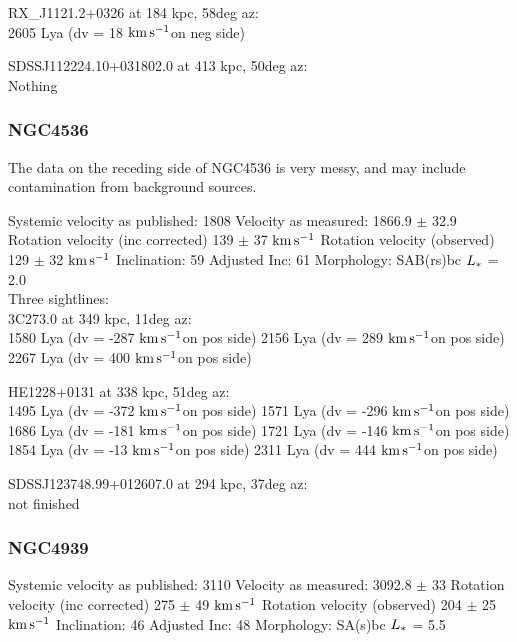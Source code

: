 \documentclass[iop]{emulateapj-rtx4}
\newcommand{\kms}{$\rm km\, s^{-1}$}
\begin{document}
RX\_J1121.2+0326 at 184 kpc, 58deg az: \\
2605 Lya (dv = 18 \kms on neg side)


SDSSJ112224.10+031802.0 at 413 kpc, 50deg az: \\
Nothing


\subsubsection{NGC4536}
The data on the receding side of NGC4536 is very messy, and may include contamination from background sources. 



Systemic velocity as published: 1808
Velocity as measured: 1866.9 $\pm$ 32.9
Rotation velocity (inc corrected) 139 $\pm$ 37 \kms
Rotation velocity (observed) 129 $\pm$ 32 \kms
Inclination: 59
Adjusted Inc: 61
Morphology: SAB(rs)bc
$L_{\**}$ = 2.0 \\

Three sightlines: \\
3C273.0 at 349 kpc, 11deg az: \\
1580 Lya (dv = -287 \kms on pos side)
2156 Lya (dv = 289 \kms on pos side)
2267 Lya (dv = 400 \kms on pos side)


HE1228+0131 at 338 kpc, 51deg az: \\
1495 Lya (dv = -372 \kms on pos side)
1571 Lya (dv = -296 \kms on pos side)
1686 Lya (dv = -181 \kms on pos side)
1721 Lya (dv = -146 \kms on pos side)
1854 Lya (dv = -13 \kms on pos side)
2311 Lya (dv = 444 \kms on pos side)

SDSSJ123748.99+012607.0 at  294 kpc, 37deg az: \\
not finished


\subsubsection{NGC4939}
Systemic velocity as published: 3110
Velocity as measured: 3092.8 $\pm$ 33
Rotation velocity (inc corrected) 275 $\pm$ 49 \kms
Rotation velocity (observed) 204 $\pm$ 25 \kms
Inclination: 46
Adjusted Inc: 48
Morphology: SA(s)bc
$L_{\**}$ = 5.5 \\
\end{document}

